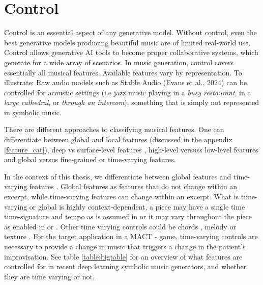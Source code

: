 \section{Control} \label{section:control}
Control is an essential aspect of any generative model. Without control, even the best generative models producing beautiful music are of limited real-world use. Control allows generative AI tools to become proper collaborative systems, which generate for a wide array of scenarios. In music generation, control covers essentially all musical features. Available features vary by representation. To illustrate:
Raw audio models such as Stable Audio (Evans et al., 2024) can be controlled for acoustic settings (i.e jazz music playing in a \textit{busy restaurant}, in a \textit{large cathedral}, or \textit{through an intercom}), something that is simply not represented in symbolic music. 

There are different approaches to classifying musical features. 
One can differentiate between global and local features \cite{Van_Kranenburg_Volk_Wiering_2013} (discussed in the appendix \ref{feature_cat}), 
deep vs surface-level features \cite{Blacking_1971}, high-level versuss low-level features \cite{Tan_Herremans_2020} and global versus fine-grained or time-varying features. 

In the context of this thesis, we differentiate between global features and time-varying features \cite{Rütte_figaro_2023}. Global features as features that do not change within an excerpt, while time-varying features can change within an excerpt. What is time-varying or global is highly context-dependent, a piece may have a single time time-signature and tempo as is assumed in \cite{Lu_Xu_Kang_Yu_Xing_Tan_Bian_MuseCoco_2023} or it may vary throughout the piece as enabled in \cite{Rütte_figaro_2023} or \cite{Huang_Yang_remi_pop_transformer_2020}. Other time varying controls could be chords \cite{Rütte_figaro_2023}\cite{Wu_Donahue_musicontrolnet_2023}\cite{Lan_Hsiao_Cheng_Yang_musicongen_2024}\cite{Min_Jiang_Xia_Zhao_polyffusion_2023}, melody \cite{copet2023simple}\cite{Min_Jiang_Xia_Zhao_polyffusion_2023} or texture \cite{Min_Jiang_Xia_Zhao_polyffusion_2023}. For the target application in a MACT - game, time-varying controls are necessary to provide a change in music that triggers a change in the patient's improvisation. See table \ref{table:bigtable} for an overview of what features are controlled for in recent deep learning symbolic music generators, and whether they are time varying or not. 
 

